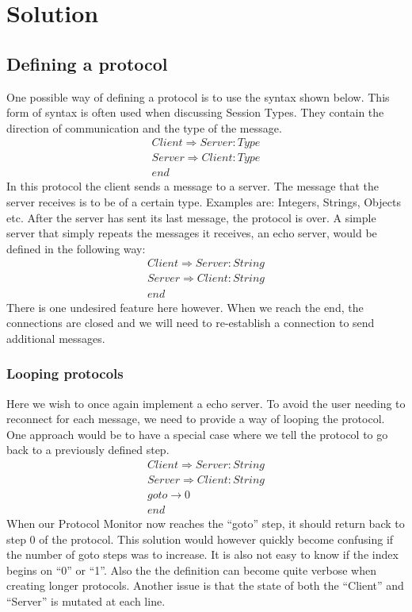 \section{Solution}
\subsection{Defining a protocol}
One possible way of defining a protocol is to use the syntax shown below. This form of syntax is often used when discussing Session Types. They contain the direction of communication and the type of the message. 
$$
\begin{multlined}
Client \Rightarrow Server : Type \\ 
Server \Rightarrow Client : Type \\
end
\end{multlined}
$$
In this protocol the client sends a message to a server. The message that the server receives is to be of a certain type. Examples are: Integers, Strings, Objects etc. After the server has sent its last message, the protocol is over. 
A simple server that simply repeats the messages it receives, an echo server, would be defined in the following way:
$$
\begin{multlined}
Client \Rightarrow Server : String \\ 
Server \Rightarrow Client : String \\
end
\end{multlined}
$$
There is one undesired feature here however. When we reach the end, the connections are closed and we will need to re-establish a connection to send additional messages.
\subsubsection{Looping protocols}
Here we wish to once again implement a echo server. To avoid the user needing to reconnect for each message, we need to provide a way of looping the protocol. One approach would be to have a special case where we tell the protocol to go back to a previously defined step.
$$
\begin{multlined}
Client \Rightarrow Server : String \\ 
Server \Rightarrow Client : String \\ 
goto \rightarrow 0 \\
end
\end{multlined}
$$
When our Protocol Monitor now reaches the ``goto'' step, it should return back to step 0 of the protocol. This solution would however quickly become confusing if the number of goto steps was to increase. It is also not easy to know if the index begins on ``0'' or ``1''.
Also the the definition can become quite verbose when creating longer protocols. Another issue is that the state of both the ``Client'' and ``Server'' is mutated at each line.

